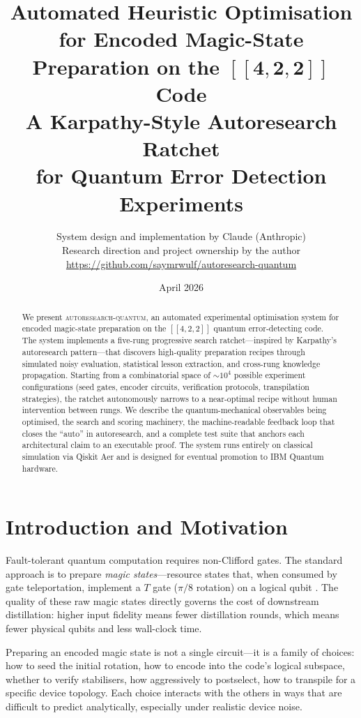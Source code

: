 \documentclass[11pt,a4paper]{article}
\title{%
  \textbf{Automated Heuristic Optimisation for Encoded Magic-State\\
  Preparation on the $\boldsymbol{[\![4,2,2]\!]}$ Code}\\[0.8em]
  \large A Karpathy-Style Autoresearch Ratchet\\
  for Quantum Error Detection Experiments
}
\author{%
  System design and implementation by Claude (Anthropic)\\
  Research direction and project ownership by the author\\[0.3em]
  {\small \url{https://github.com/saymrwulf/autoresearch-quantum}}
}
\date{April 2026}
\begin{document}
\maketitle

\begin{abstract}
We present \textsc{autoresearch-quantum}, an automated experimental
optimisation system for encoded magic-state preparation on the $[\![4,2,2]\!]$
quantum error-detecting code. The system implements a five-rung progressive
search ratchet---inspired by Karpathy's autoresearch pattern---that
discovers high-quality preparation recipes through simulated noisy evaluation,
statistical lesson extraction, and cross-rung knowledge propagation. Starting
from a combinatorial space of ${\sim}10^4$ possible experiment configurations
(seed gates, encoder circuits, verification protocols, transpilation
strategies), the ratchet autonomously narrows to a near-optimal recipe without
human intervention between rungs. We describe the quantum-mechanical
observables being optimised, the search and scoring machinery, the
machine-readable feedback loop that closes the ``auto'' in autoresearch, and
a complete test suite that anchors each architectural claim to an executable
proof. The system runs entirely on classical simulation via Qiskit Aer and is
designed for eventual promotion to IBM Quantum hardware.
\end{abstract}

\tableofcontents
\newpage

\section{Introduction and Motivation}
\label{sec:intro}

Fault-tolerant quantum computation requires non-Clifford gates. The standard
approach is to prepare \emph{magic states}---resource states that, when
consumed by gate teleportation, implement a $T$ gate ($\pi/8$ rotation) on
a logical qubit \cite{bravyi2005}. The quality of these raw magic states
directly governs the cost of downstream distillation: higher input fidelity
means fewer distillation rounds, which means fewer physical qubits and less
wall-clock time.

Preparing an encoded magic state is not a single circuit---it is a family of
choices: how to seed the initial rotation, how to encode into the code's
logical subspace, whether to verify stabilisers, how aggressively to
postselect, how to transpile for a specific device topology. Each choice
interacts with the others in ways that are difficult to predict analytically,
especially under realistic device noise.
\end{document}
